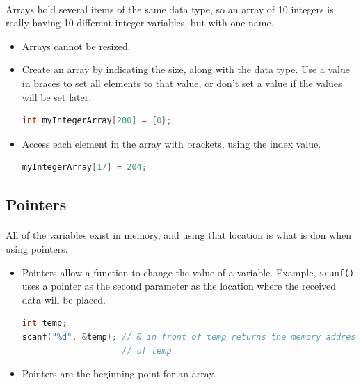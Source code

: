 \documentclass[letter,11pt]{article}
\begin{document}
\paragraph{}Arrays hold several items of the same data type, so an array of 10 integers is really having 10 different integer variables, but with one name.
\begin{itemize}
    \item Arrays cannot be resized.
    \item Create an array by indicating the size, along with the data type. Use a value in braces to set all elements to that value, or don't set a value if the values will be set later.
    \begin{lstlisting}[language=C,basicstyle=\footnotesize,keywordstyle=\color{blue},commentstyle=\color{green},showstringspaces=false,stringstyle=\color{red}]
        int myIntegerArray[200] = {0};
    \end{lstlisting}
    \item Access each element in the array with brackets, using the index value.
    \begin{lstlisting}[language=C,basicstyle=\footnotesize,keywordstyle=\color{blue},commentstyle=\color{green},showstringspaces=false,stringstyle=\color{red}]
        myIntegerArray[17] = 204;
    \end{lstlisting}
\end{itemize}

\subsection{Pointers}
\paragraph{}All of the variables exist in memory, and using that location is what is don when using pointers.
\begin{itemize}
    \item Pointers allow a function to change the value of a variable. Example, \texttt{scanf()} uses a pointer as the second parameter as the location where the received data will be placed.
    \begin{lstlisting}[language=C,basicstyle=\footnotesize,keywordstyle=\color{blue},commentstyle=\color{green},showstringspaces=false,stringstyle=\color{red}]
int temp;
scanf("%d", &temp); // & in front of temp returns the memory address, or pointer,
                    // of temp
    \end{lstlisting}
    \item Pointers are the beginning point for an array.
\end{itemize}
\end{document}
